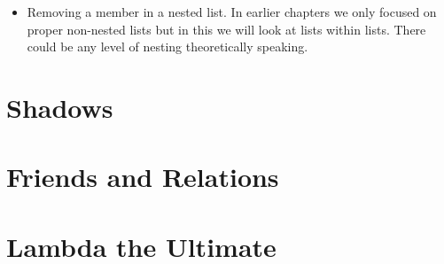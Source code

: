 \documentclass[11pt]{article}
\begin{document}
\vspace{1em}

\begin{itemize}
\item Removing a member in a nested list. In earlier chapters we only focused on proper non-nested lists but in this we will look at lists within lists. There could
be any level of nesting theoretically speaking.
\end{itemize}

\newpage




























































\section{Shadows}
\label{sec:org07c2ab6}

\newpage

\section{Friends and Relations}
\label{sec:org2c7654f}

\newpage

\section{Lambda the Ultimate}
\label{sec:org819f237}
\end{document}
